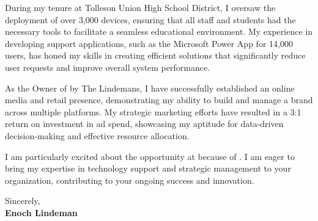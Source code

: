During my tenure at Tolleson Union High School District, I oversaw the deployment of over 3,000 devices, ensuring that all staff and students had the necessary tools to facilitate a seamless educational environment. My experience in developing support applications, such as the Microsoft Power App for 14,000 users, has honed my skills in creating efficient solutions that significantly reduce user requests and improve overall system performance.

As the Owner of by The Lindemans, I have successfully established an online media and retail presence, demonstrating my ability to build and manage a brand across multiple platforms. My strategic marketing efforts have resulted in a 3:1 return on investment in ad spend, showcasing my aptitude for data-driven decision-making and effective resource allocation.

I am particularly excited about the opportunity at \textbf{\CompanyName} because of \textbf{\SpecificReason}. I am eager to bring my expertise in technology support and strategic management to your organization, contributing to your ongoing success and innovation.

\vspace{0.5cm}

\noindent Sincerely, \\
\noindent \textbf{Enoch Lindeman}


